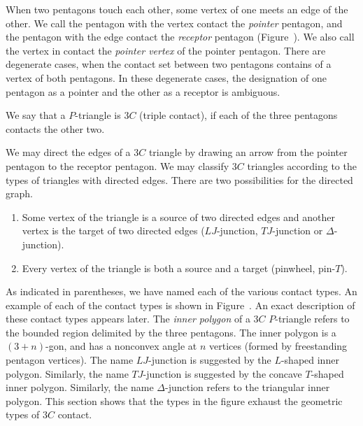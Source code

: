 When two pentagons touch each other, some vertex of one meets an edge
of the other.  We call the pentagon with the vertex contact the {\it
  pointer} pentagon, and the pentagon with the edge contact the {\it
  receptor} pentagon (Figure~).  We also call the
vertex in contact the {\it pointer vertex} of the pointer
pentagon. There are degenerate cases, when the contact set between two
pentagons contains of a vertex of both pentagons.  In these degenerate
cases, the designation of one pentagon as a pointer and the other as a
receptor is ambiguous.


We say that a $P$-triangle is $3C$ (triple contact),
if each of the three pentagons contacts the other two.

We may direct the edges of a $3C$ triangle by drawing an arrow from
the pointer pentagon to the receptor pentagon.  We may classify $3C$
triangles according to the types of triangles with directed edges.
There are two possibilities for the directed graph.
\begin{enumerate}
\item Some vertex of the triangle is a source of two directed edges
  and another vertex is the target of two directed edges
  ($LJ$-junction, $TJ$-junction or $\Delta$-junction).
\item Every vertex of the triangle is both a source and a target
  (pinwheel, pin-$T$).
\end{enumerate}

As indicated in parentheses, we have named each of the various contact
types.  An example of each of the contact types is shown in
Figure~.  An exact description of these contact types
appears later.  The \emph{inner polygon} of a $3C$ $P$-triangle refers to
the bounded region delimited by the three pentagons.  The inner
polygon is a $(3+n)$-gon, and has a nonconvex angle at $n$ vertices
(formed by freestanding pentagon vertices). The name $LJ$-junction is
suggested by the $L$-shaped inner polygon.  Similarly, the name
$TJ$-junction is suggested by the concave $T$-shaped inner polygon.
Similarly, the name $\Delta$-junction refers to the triangular inner polygon.
This section shows that the types in the figure exhaust the geometric
types of $3C$ contact.

